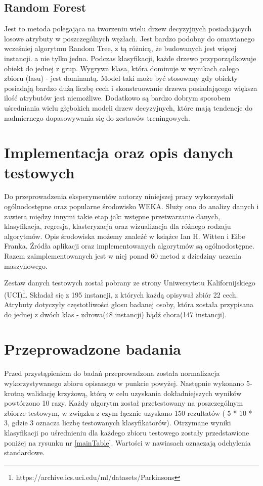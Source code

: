 \documentclass[conference]{IEEEtran}
\begin{document}
\subsection{Random Forest}
Jest to metoda polegająca na tworzeniu wielu drzew decyzyjnych posiadających losowe atrybuty w poszczególnych węzłach. Jest bardzo podobny do omawianego wcześniej algorytmu Random Tree, z  tą różnicą, że budowanych jest więcej instancji. a nie tylko jedna. Podczas klasyfikacji, każde drzewo przyporządkowuje obiekt do jednej z grup. Wygrywa klasa, która dominuje w wynikach całego zbioru (lasu) - jest dominantą. Model taki może być stosowany gdy obiekty posiadają bardzo dużą liczbę cech i skonstruowanie drzewa posiadającego większa ilość atrybutów  jest niemożliwe. Dodatkowo są bardzo dobrym sposobem uśredniania wielu głębokich modeli drzew decyzyjnych, które mają tendencje do nadmiernego dopasowywania się do zestawów treningowych.

\section{Implementacja oraz opis danych testowych}
Do przeprowadzenia eksperymentów autorzy niniejszej pracy wykorzystali ogólnodostępne oraz popularne środowisko WEKA. Służy ono do analizy danych i zawiera między innymi takie etap jak: wstępne przetwarzanie danych, klasyfikacja, regresja, klasteryzacja oraz wizualizacja dla różnego rodzaju algorytmów. Opis środowiska możemy znaleźć w książce Ian H. Witten i Eibe Franka. Źródła aplikacji oraz implementowanych algorytmów są ogólnodostępne. Razem zaimplementowanych jest w niej ponad 60 metod z dziedziny uczenia maszynowego. 

Zestaw danych testowych został pobrany ze strony Uniwersytetu Kalifornijskiego (UCI)\footnote{https://archive.ics.uci.edu/ml/datasets/Parkinsons}. Składał się z 195 instancji, z których każdą opisywał zbiór 22 cech. Atrybuty dotyczyły częstotliwości głosu badanej osoby, która została przypisana do jednej z dwóch klas - zdrowa(48 instancji) bądź chora(147 instancji). 

\section{Przeprowadzone badania}
Przed przystąpieniem do badań przeprowadzona została normalizacja wykorzystywanego zbioru opisanego w punkcie powyżej. Następnie wykonano 5-krotną walidację krzyżową, którą w celu uzyskania dokładniejszych wyników powtórzono 10 razy. Każdy algorytm został przetestowany na poszczególnym zbiorze testowym, w związku z czym łącznie uzyskano 150 rezultatów ( 5 * 10 * 3, gdzie 3 oznacza liczbę testowanych klasyfikatorów). Otrzymane wyniki klasyfikacji po uśrednieniu dla każdego zbioru testowego zostały przedstawione poniżej na rysunku nr \ref{mainTable}. Wartości w nawiasach oznaczają odchylenia standardowe.
\end{document}
